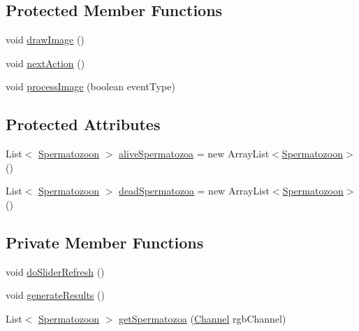 \subsection*{Protected Member Functions}
\begin{DoxyCompactItemize}
\item 
void \hyperlink{classgui_1_1_viability_window_af3a8c3ee2b9b6c5c415df634105b5945}{draw\+Image} ()
\item 
void \hyperlink{classgui_1_1_viability_window_a2fcbb99ba607aa4f115acdfa4b2bc7f7}{next\+Action} ()
\item 
void \hyperlink{classgui_1_1_viability_window_a92de44ef00adbefce701ecb95b7d926b}{process\+Image} (boolean event\+Type)
\end{DoxyCompactItemize}
\subsection*{Protected Attributes}
\begin{DoxyCompactItemize}
\item 
List$<$ \hyperlink{classdata_1_1_spermatozoon}{Spermatozoon} $>$ \hyperlink{classgui_1_1_viability_window_a3990fd3a99cde29eac35061c41b3434b}{alive\+Spermatozoa} = new Array\+List$<$\hyperlink{classdata_1_1_spermatozoon}{Spermatozoon}$>$()
\item 
List$<$ \hyperlink{classdata_1_1_spermatozoon}{Spermatozoon} $>$ \hyperlink{classgui_1_1_viability_window_a4f0cf0c5a0eb117170a840a24ebe2a3c}{dead\+Spermatozoa} = new Array\+List$<$\hyperlink{classdata_1_1_spermatozoon}{Spermatozoon}$>$()
\end{DoxyCompactItemize}
\subsection*{Private Member Functions}
\begin{DoxyCompactItemize}
\item 
void \hyperlink{classgui_1_1_viability_window_a7db6c32207f03c20a1b7932a5f804435}{do\+Slider\+Refresh} ()
\item 
void \hyperlink{classgui_1_1_viability_window_a754be7a1ad7ccf944469a5960baf52b3}{generate\+Results} ()
\item 
List$<$ \hyperlink{classdata_1_1_spermatozoon}{Spermatozoon} $>$ \hyperlink{classgui_1_1_viability_window_a21bfc28b8acdf4451eec7e3bc2060c61}{get\+Spermatozoa} (\hyperlink{enumgui_1_1_viability_window_1_1_channel}{Channel} rgb\+Channel)
\end{DoxyCompactItemize}
